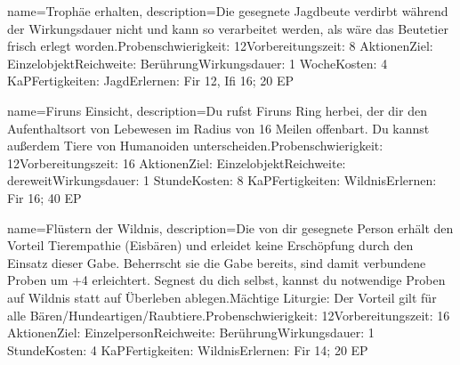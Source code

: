 {
    name={Trophäe erhalten},
    description={Die gesegnete Jagdbeute verdirbt während der Wirkungsdauer nicht und kann so verarbeitet werden, als wäre das Beutetier frisch erlegt worden.\newline Probenschwierigkeit: 12\newline Vorbereitungszeit: 8 Aktionen\newline Ziel: Einzelobjekt\newline Reichweite: Berührung\newline Wirkungsdauer: 1 Woche\newline Kosten: 4 KaP\newline Fertigkeiten: Jagd\newline Erlernen: Fir 12, Ifi 16; 20 EP}
}


{
    name={Firuns Einsicht},
    description={Du rufst Firuns Ring herbei, der dir den Aufenthaltsort von Lebewesen im Radius von 16 Meilen offenbart. Du kannst außerdem Tiere von Humanoiden unterscheiden.\newline Probenschwierigkeit: 12\newline Vorbereitungszeit: 16 Aktionen\newline Ziel: Einzelobjekt\newline Reichweite: dereweit\newline Wirkungsdauer: 1 Stunde\newline Kosten: 8 KaP\newline Fertigkeiten: Wildnis\newline Erlernen: Fir 16; 40 EP}
}


{
    name={Flüstern der Wildnis},
    description={Die von dir gesegnete Person erhält den Vorteil Tierempathie (Eisbären) und erleidet keine Erschöpfung durch den Einsatz dieser Gabe. Beherrscht sie die Gabe bereits, sind damit verbundene Proben um +4 erleichtert. Segnest du dich selbst, kannst du notwendige Proben auf Wildnis statt auf Überleben ablegen.\newline Mächtige Liturgie: Der Vorteil gilt für alle Bären/Hundeartigen/Raubtiere.\newline Probenschwierigkeit: 12\newline Vorbereitungszeit: 16 Aktionen\newline Ziel: Einzelperson\newline Reichweite: Berührung\newline Wirkungsdauer: 1 Stunde\newline Kosten: 4 KaP\newline Fertigkeiten: Wildnis\newline Erlernen: Fir 14; 20 EP}
}


